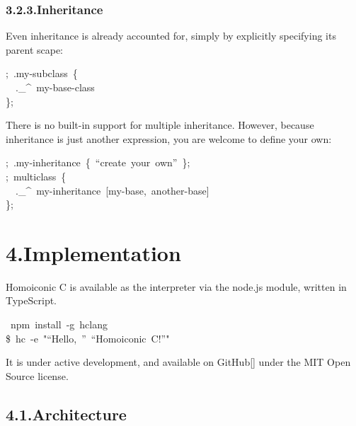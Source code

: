 \documentclass[preprint]{{acmart}}
\begin{document}
\subsubsection{3.2.3.\hspace*{0.5em}Inheritance}\label{sec-inheritance}%

\noindent{}Even inheritance is already accounted for, simply by explicitly specifying
its parent scape:%
\begin{mdpre}%
\noindent;~.my-subclass~\{\\
~~.\_\textasciicircum{}~my-base-{class}\\
\};%
\end{mdpre}\noindent{}There is no built-in support for multiple inheritance.  However, because
inheritance is just another expression, you are welcome to define your own:
\begin{mdpre}%
\noindent;~.my-inheritance~\{~“create~your~own”~\};\\
;~multiclass~\{\\
~~.\_\textasciicircum{}~my-inheritance~{}[my-base,~another-base]\\
\};%
\end{mdpre}
\section{4.\hspace*{0.5em}Implementation}\label{sec-implementation}%

\noindent{} Homoiconic C is available as the  interpreter via the 
 node.js module, written in TypeScript.%
\begin{mdpre}%
~npm~install~-g~hclang\\
{\$}~hc~-e~{"}{“Hello,~”~“Homoiconic~C!”}{"}%
\end{mdpre}\noindent{}It is under active development, and available on GitHub[] under
the MIT Open Source license.

\subsection{4.1.\hspace*{0.5em}Architecture}\label{sec-architecture}%
\end{document}
